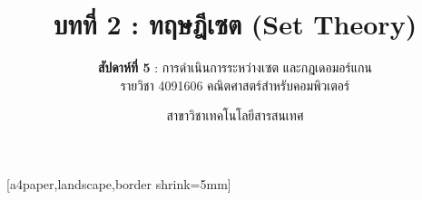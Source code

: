 \def\HANDOUTMODE{}

\usepackage{pgfpages}
[a4paper,landscape,border shrink=5mm]
\renewcommand{\footchaptertitle}{บทที่ 2 ทฤษฎีเซต (สัปดาห์ที่ 5) — Handout}

\title{\textbf{บทที่ 2 : ทฤษฎีเซต (Set Theory)}}
\subtitle{\textbf{สัปดาห์ที่ 5} : การดำเนินการระหว่างเซต และกฎเดอมอร์แกน \\ รายวิชา 4091606 คณิตศาสตร์สำหรับคอมพิวเตอร์}
\author{สาขาวิชาเทคโนโลยีสารสนเทศ}
\date{}




